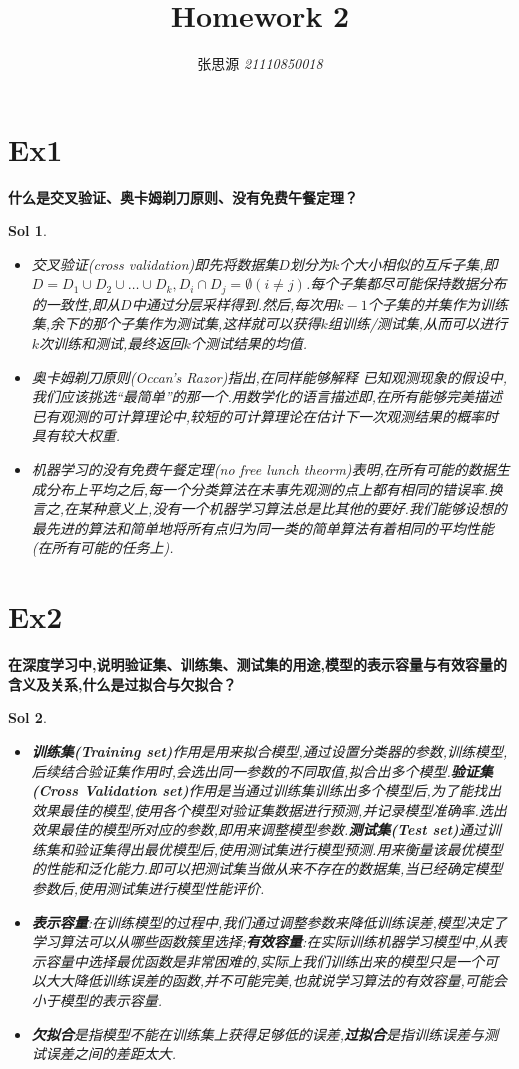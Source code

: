 \documentclass[UTF8,a4paper,11pt]{ctexart}
\title{\textbf{Homework 2}}
\author{ 张思源  \qquad  \textit{21110850018} }   %
\newtheorem{sol}{Sol}[section]
\begin{document}
\maketitle
\section{Ex1}
\textbf{什么是交叉验证、奥卡姆剃刀原则、没有免费午餐定理？}
\begin{sol}
	\begin{itemize}
		\item 交叉验证(cross validation)即先将数据集$D$划分为$k$个大小相似的互斥子集,即$D=D_{1}\cup D_{2}\cup\dots\cup D_{k},D_{i}\cap D_{j}=\emptyset(i\ne j)$.每个子集都尽可能保持数据分布的一致性,即从$D$中通过分层采样得到.然后,每次用$k-1$个子集的并集作为训练集,余下的那个子集作为测试集,这样就可以获得$k$组训练/测试集,从而可以进行$k$次训练和测试,最终返回$k$个测试结果的均值.
		\item 奥卡姆剃刀原则(Occan's Razor)指出,在同样能够解释 已知观测现象的假设中,我们应该挑选“最简单”的那一个.用数学化的语言描述即,在所有能够完美描述已有观测的可计算理论中,较短的可计算理论在估计下一次观测结果的概率时具有较大权重.
		\item 机器学习的没有免费午餐定理(no free lunch theorm)表明,在所有可能的数据生成分布上平均之后,每一个分类算法在未事先观测的点上都有相同的错误率.换言之,在某种意义上,没有一个机器学习算法总是比其他的要好.我们能够设想的最先进的算法和简单地将所有点归为同一类的简单算法有着相同的平均性能(在所有可能的任务上).
	\end{itemize}
\end{sol}
\section{Ex2}
\textbf{在深度学习中,说明验证集、训练集、测试集的用途,模型的表示容量与有效容量的含义及关系,什么是过拟合与欠拟合？}
\begin{sol}
	\begin{itemize}
		\item \textbf{训练集(Training set)}作用是用来拟合模型,通过设置分类器的参数,训练模型,后续结合验证集作用时,会选出同一参数的不同取值,拟合出多个模型.\textbf{验证集(Cross Validation set)}作用是当通过训练集训练出多个模型后,为了能找出效果最佳的模型,使用各个模型对验证集数据进行预测,并记录模型准确率.选出效果最佳的模型所对应的参数,即用来调整模型参数.\textbf{测试集(Test set)}通过训练集和验证集得出最优模型后,使用测试集进行模型预测.用来衡量该最优模型的性能和泛化能力.即可以把测试集当做从来不存在的数据集,当已经确定模型参数后,使用测试集进行模型性能评价.
		\item \textbf{表示容量}:在训练模型的过程中,我们通过调整参数来降低训练误差,模型决定了学习算法可以从哪些函数簇里选择;\textbf{有效容量}:在实际训练机器学习模型中,从表示容量中选择最优函数是非常困难的,实际上我们训练出来的模型只是一个可以大大降低训练误差的函数,并不可能完美,也就说学习算法的有效容量,可能会小于模型的表示容量.
		\item \textbf{欠拟合}是指模型不能在训练集上获得足够低的误差,\textbf{过拟合}是指训练误差与测试误差之间的差距太大.

	\end{itemize}
\end{sol}
\end{document}
